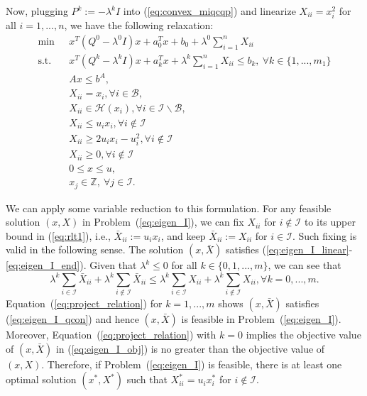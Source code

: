 \documentclass[]{article}
\begin{document}
Now, plugging $P^k := -\lambda^k I$ into (\ref{eq:convex_miqcqp}) and linearize $X_{ii} = x_i^2$ for all $i=1,...,n$, we have the following relaxation:
\begin{subequations}\label{eq:eigen_I}
    \begin{align}
        \min\ &x^T(Q^0 - \lambda^0I)x + a_0^Tx + b_0 + \lambda^0\sum_{i=1}^n X_{ii} \label{eq:eigen_I_obj}\\
        \mbox{s.t.}\quad &x^T(Q^k -\lambda^k I)x + a_k^Tx + \lambda^k\sum_{i=1}^n X_{ii} \leq b_k,\ \forall k\in\{1,...,m_1\} \label{eq:eigen_I_qcon}\\
        &Ax \leq b^A,\label{eq:eigen_I_linear}\\
        &X_{ii} = x_i, \forall i\in\mathcal{B},\\
        &X_{ii} \in \mathcal{H}(x_i), \forall i\in\mathcal{I}\backslash \mathcal{B},\\
        &X_{ii} \leq u_ix_i, \forall i\notin\mathcal{I} \label{eq:rlt1}\\
        &X_{ii} \geq 2u_ix_i-u^2_i, \forall i\notin\mathcal{I} \label{eq:rlt2}\\
        &X_{ii} \geq 0, \forall i\notin\mathcal{I}\label{eq:rlt3}\\
        &0 \leq x \leq u,\\
        &x_j\in \mathbb{Z},\ \forall j\in\mathcal{I}\label{eq:eigen_I_end}.
    \end{align}
\end{subequations}

We can apply some variable reduction to this formulation. For any feasible solution $(x, X)$ in Problem~(\ref{eq:eigen_I}), we can fix $X_{ii}$ for $i\notin\mathcal{I}$ to its upper bound in (\ref{eq:rlt1}), i.e., $\bar{X}_{ii} := u_ix_i$, and keep $\bar{X}_{ii} := X_{ii}$ for $i\in\mathcal{I}$. Such fixing is valid in the following sense. The solution $(x, \bar{X})$ satisfies (\ref{eq:eigen_I_linear}-\ref{eq:eigen_I_end}). Given that $\lambda^k \leq 0$ for all $k\in\{0,1,...,m\}$, we can see that
\begin{equation}\label{eq:project_relation}
    \lambda^k\sum_{i\in\mathcal{I}} \bar{X}_{ii} + \lambda^k\sum_{i\notin\mathcal{I}} \bar{X}_{ii} \leq \lambda^k\sum_{i\in\mathcal{I}} X_{ii} + \lambda^k\sum_{i\notin\mathcal{I}} X_{ii}, \forall k=0,...,m.
\end{equation}
Equation~(\ref{eq:project_relation}) for $k=1,...,m$ shows $(x, \bar{X})$ satisfies (\ref{eq:eigen_I_qcon}) and hence $(x, \bar{X})$ is feasible in Problem~(\ref{eq:eigen_I}). Moreover, Equation~(\ref{eq:project_relation}) with $k=0$ implies the objective value of $(x, \bar{X})$ in (\ref{eq:eigen_I_obj}) is no greater than the objective value of $(x, X)$. Therefore, if Problem~(\ref{eq:eigen_I}) is feasible, there is at least one optimal solution $(x^*,X^*)$ such that $X_{ii}^* = u_ix_i^*$ for $i\notin\mathcal{I}$. 
\end{document}
